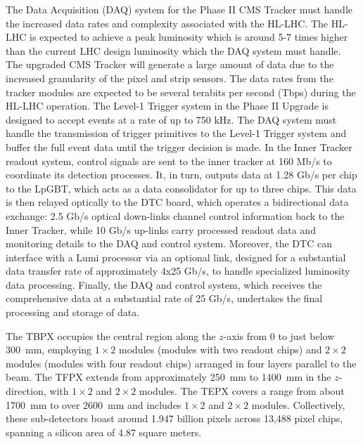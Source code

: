 The Data Acquisition (DAQ) system for the Phase II CMS Tracker must handle the increased data rates and complexity associated with the HL-LHC. The HL-LHC is expected to achieve a peak luminosity which is around 5-7 times higher than the current LHC design luminosity which the DAQ system must handle. The upgraded CMS Tracker will generate a large amount of data due to the increased granularity of the pixel and strip sensors. The data rates from the tracker modules are expected to be several terabits per second (Tbps) during the HL-LHC operation. The Level-1 Trigger system in the Phase II Upgrade is designed to accept events at a rate of up to 750 kHz. The DAQ system must handle the transmission of trigger primitives to the Level-1 Trigger system and buffer the full event data until the trigger decision is made. %
In the Inner Tracker readout system, control signals are sent to the inner tracker at 160 Mb/s to coordinate its detection processes. It, in turn, outputs data at 1.28 Gb/s per chip to the LpGBT, which acts as a data consolidator for up to three chips. This data is then relayed optically to the DTC board, which operates a bidirectional data exchange: 2.5 Gb/s optical down-links channel control information back to the Inner Tracker, while 10 Gb/s up-links carry processed readout data and monitoring details to the DAQ and control system. Moreover, the DTC can interface with a Lumi processor via an optional link, designed for a substantial data transfer rate of approximately 4x25 Gb/s, to handle specialized luminosity data processing. Finally, the DAQ and control system, which receives the comprehensive data at a substantial rate of 25 Gb/s, undertakes the final processing and storage of data.


The TBPX occupies the central region along the \( z \)-axis from 0 to just below 300~mm, employing \( 1 \times 2 \) modules (modules with two readout chips) and \( 2 \times 2 \) modules (modules with four readout chips) arranged in four layers parallel to the beam. The TFPX extends from approximately 250~mm to 1400~mm in the \( z \)-direction, with \( 1 \times 2 \) and \( 2 \times 2 \) modules. The TEPX covers a range from about 1700~mm to over 2600~mm and includes  \( 1 \times 2 \) and \( 2 \times 2 \) modules. Collectively, these sub-detectors boast around 1.947 billion pixels across 13,488 pixel chips, spanning a silicon area of 4.87 square meters.


